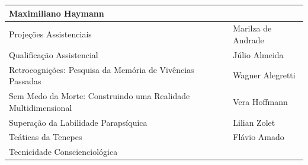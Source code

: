 \documentclass{gescons}
\begin{document}
\begin{longtable}[]{@{}
  >{\raggedright\arraybackslash}p{}
  >{\raggedright\arraybackslash}p{}@{}}
\begin{minipage}[t]{\linewidth}
Maximiliano Haymann
\end{minipage} \\
\hline
\begin{minipage}[t]{\linewidth}\raggedright
Projeções Assistenciais
\end{minipage} & \begin{minipage}[t]{\linewidth}\raggedright
Marilza de Andrade
\end{minipage} \\
\hline
\begin{minipage}[t]{\linewidth}\raggedright
Qualificação Assistencial
\end{minipage} & \begin{minipage}[t]{\linewidth}\raggedright
Júlio Almeida
\end{minipage} \\
\hline
\begin{minipage}[t]{\linewidth}\raggedright
Retrocognições: Pesquisa da Memória de Vivências Passadas
\end{minipage} & \begin{minipage}[t]{\linewidth}\raggedright
Wagner Alegretti
\end{minipage} \\
\hline
\begin{minipage}[t]{\linewidth}\raggedright
Sem Medo da Morte: Construindo uma Realidade Multidimensional
\end{minipage} & \begin{minipage}[t]{\linewidth}\raggedright
Vera Hoffmann
\end{minipage} \\
\hline
\begin{minipage}[t]{\linewidth}\raggedright
Superação da Labilidade Parapsíquica
\end{minipage} & \begin{minipage}[t]{\linewidth}\raggedright
Lilian Zolet
\end{minipage} \\
\hline
\begin{minipage}[t]{\linewidth}\raggedright
Teáticas da Tenepes
\end{minipage} & \begin{minipage}[t]{\linewidth}\raggedright
Flávio Amado
\end{minipage} \\
\hline
\begin{minipage}[t]{\linewidth}\raggedright
Tecnicidade Conscienciológica
\end{minipage} & \begin{minipage}[t]{\linewidth}\raggedright

\end{minipage}
\end{longtable}
\end{document}
